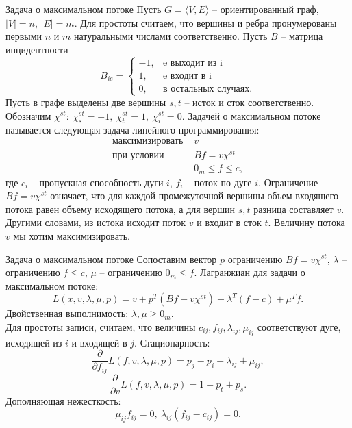 \documentclass[10pt]{beamer}
\begin{document}
\begin{frame}{Задача о максимальном потоке}
Пусть $G=\langle V, E\rangle$ -- ориентированный граф, $|V|=n$, $|E|=m$. Для простоты считаем, что вершины и ребра пронумерованы первыми $n$ и $m$ натуральными числами соответственно. Пусть $B$ -- матрица инцидентности
$$
B_{ie}=\left\{
\begin{array}{ll}
-1, & \mbox{e выходит из i} \\
1, & \mbox{e входит в i} \\ 
0, & \mbox{в остальных случаях}.
\end{array}\right.
$$
Пусть в графе выделены две вершины $s,t$ -- исток и сток соответственно. Обозначим $\chi^{st}:~\chi^{st}_s=-1,~\chi^{st}_t=1,~\chi^{st}_i=0$. Задачей о максимальном потоке называется следующая задача линейного программирования:
$$
\begin{array}{ll}
\mbox{максимизировать } & v \\ 
\mbox{при условии }     & Bf=v\chi^{st}\\
 & 0_m\leq f\leq c,
\end{array}
$$
где $c_i$ -- пропускная способность дуги $i$, $f_i$ -- поток по дуге $i$. Ограничение $Bf=v\chi^{st}$ означает, что для каждой промежуточной вершины объем входящего потока равен объему исходящего потока, а для вершин $s,t$ разница составляет $v$. Другими словами, из истока исходит поток $v$ и входит в сток $t$. Величину потока $v$ мы хотим максимизировать.
\end{frame}

\begin{frame}{Задача о максимальном потоке}
Сопоставим вектор $p$ ограничению $Bf=v\chi^{st}$, $\lambda$ -- ограничению $f\leq c$, $\mu$ -- ограничению $0_m\leq f$. Лагранжиан для задачи о максимальном потоке:
$$
L(x, v, \lambda, \mu, p)=v+p^T(Bf-v\chi^{st})-\lambda^T(f-c)+\mu^Tf.
$$
Двойственная выполнимость: $\lambda, \mu\geq 0_m$.\\
Для простоты записи, считаем, что величины $c_{ij}, f_{ij}, \lambda_{ij}, \mu_{ij}$ соответствуют дуге, исходящей из $i$ и входящей в $j$. Стационарность:
$$
\frac{\partial}{\partial f_{ij}}L(f, v, \lambda, \mu, p)=p_j-p_i-\lambda_{ij}+\mu_{ij},
$$
$$
\frac{\partial}{\partial v}L(f, v, \lambda, \mu, p)=1-p_t+p_s.
$$
Дополняющая нежесткость:
$$
\mu_{ij}f_{ij}=0,~\lambda_{ij}(f_{ij}-c_{ij})=0.
$$
\end{frame}
\end{document}
